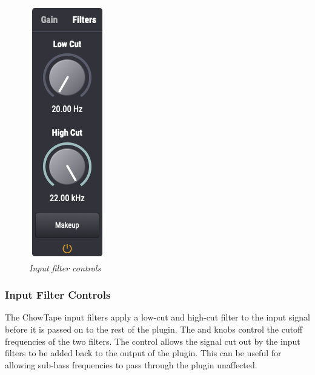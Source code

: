 \documentclass[landscape,twocolumn,a5paper]{manual}
\begin{document}
\begin{figure}[ht]
    \center
    \includegraphics[height=0.32\paperheight]{../Plugin/Screenshots/Filters.png}
    \caption{\label{h_inputs}{\it Input filter controls}}
\end{figure}

\subsubsection{Input Filter Controls}
The ChowTape input filters apply a low-cut and high-cut filter
to the input signal before it is passed on to the rest of the
plugin. The  and  knobs
control the cutoff frequencies of the two filters. The
 control allows the signal cut out by the
input filters to be added back to the output of the plugin.
This can be useful for allowing sub-bass frequencies to pass
through the plugin unaffected.
\end{document}
